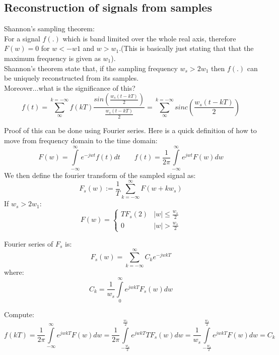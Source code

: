 \documentclass[a4paper,11pt]{article}
\begin{document}
\subsection{Reconstruction of signals from samples}
	Shannon's sampling theorem:\\
	For a signal $f(.)$ which is band limited over the whole real axis, therefore $F(w)=0$ for $w<-w1$ and $w>w_1$.(This is basically just stating that that the maximum frequency is given as $w_1$).\\
	Shannon's theorem state that, if the sampling frequency $ w_s > 2 w_1$ then $f(.)$ can be uniquely reconstructed from its samples.\\
	Moreover...what is the significance of this?
	\begin{equation}
		f(t)=\sum\limits_{\infty}^{k=-\infty}f(kT)\frac{sin(\frac{w_s(t-kT)}{2})}{\frac{w_s(t-kT)}{2}}= \sum\limits_{\infty}^{k=-\infty}sinc(\frac{w_s(t-kT)}{2})
	\end{equation}
	
	Proof of this can be done using Fourier series. Here is a quick definition of how to move from frequency domain to the time domain:
	\begin{equation}
		F(w)=\int\limits_{-\infty}^{\infty}e^{-jwt}f(t)dt
	    	\qquad
	    	f(t)=\frac{1}{2\pi}\int\limits_{-\infty}^{\infty}e^{jwt}F(w)dw
	\end{equation}	
	We then define the fourier transform of the sampled signal as:
	\begin{equation}
		F_s(w):=\frac{1}{T}\sum\limits_{k=-\infty}^{\infty}F(w+kw_s)
	\end{equation}	
	If $w_s>2w_1$:
				\[ F(w) =\begin{cases} 
      			TF_s(2) & |w|\leq \frac{w_s}{2}\\
      			0 & |w| >\frac{w_s}{2} 			
   			\end{cases}
			\]
	
	Fourier series of $F_s$ is: 
	\begin{equation}
	    F_s(w) = \sum\limits_{k=-\infty}^{\infty}C_ke^{-jwkT}
	\end{equation}
	where: 
	 \begin{equation}
	    C_k=\frac{1}{w_s} \int\limits_{0}^{\infty}e^{jwkT}F_s(w)dw
	\end{equation}
	
	
	Compute:
	 \begin{equation}
	    f(kT)=\frac{1}{2\pi}\int\limits_{-\infty}^{\infty}e^{jwkT}F(w)dw=\frac{1}{2\pi}\int\limits_{-\frac{w_s}{2}}^{\frac{w_s}{2}}e^{jwkT}TF_s(w)dw=\frac{1}{w_s}\int\limits_{-\frac{w_s}{2}}^{\frac{w_s}{2}}e^{jwkT}F(w)dw= C_k
	\end{equation}
		
\end{document}
